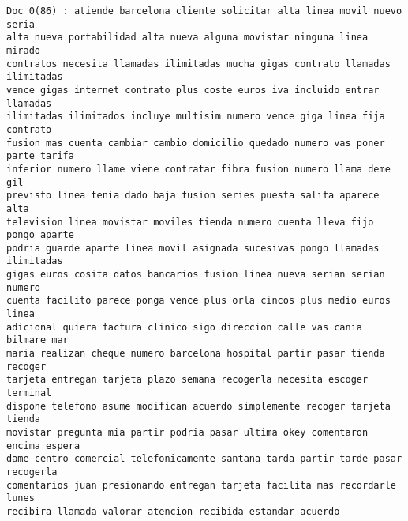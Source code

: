 \begin{Verbatim}[commandchars=\\\{\}]
Doc 0(86) : atiende barcelona cliente solicitar alta linea movil nuevo seria
alta nueva portabilidad alta nueva alguna movistar ninguna linea mirado
contratos necesita llamadas ilimitadas mucha gigas contrato llamadas ilimitadas
vence gigas internet contrato plus coste euros iva incluido entrar llamadas
ilimitadas ilimitados incluye multisim numero vence giga linea fija contrato
fusion mas cuenta cambiar cambio domicilio quedado numero vas poner parte tarifa
inferior numero llame viene contratar fibra fusion numero llama deme gil
previsto linea tenia dado baja fusion series puesta salita aparece alta
television linea movistar moviles tienda numero cuenta lleva fijo pongo aparte
podria guarde aparte linea movil asignada sucesivas pongo llamadas ilimitadas
gigas euros cosita datos bancarios fusion linea nueva serian serian numero
cuenta facilito parece ponga vence plus orla cincos plus medio euros linea
adicional quiera factura clinico sigo direccion calle vas cania bilmare mar
maria realizan cheque numero barcelona hospital partir pasar tienda recoger
tarjeta entregan tarjeta plazo semana recogerla necesita escoger terminal
dispone telefono asume modifican acuerdo simplemente recoger tarjeta tienda
movistar pregunta mia partir podria pasar ultima okey comentaron encima espera
dame centro comercial telefonicamente santana tarda partir tarde pasar recogerla
comentarios juan presionando entregan tarjeta facilita mas recordarle lunes
recibira llamada valorar atencion recibida estandar acuerdo



\end{Verbatim}

